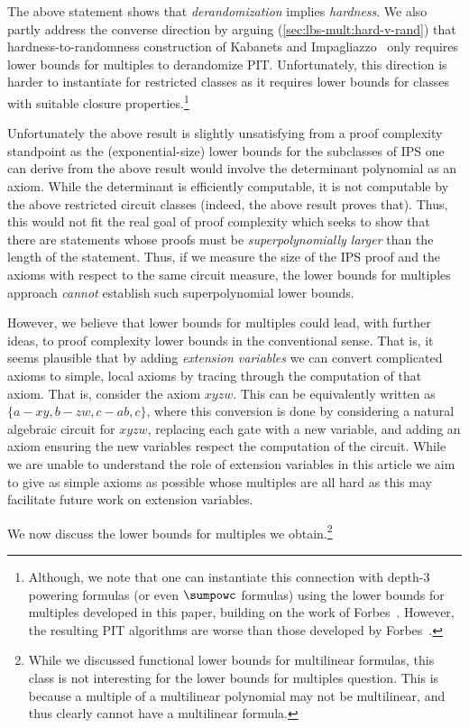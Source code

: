 \documentclass[11pt]{article}
\numberwithin{equation}{section}
\theoremstyle{definition}
\theoremstyle{plain}
\begin{document}
The above statement shows that \emph{derandomization} implies \emph{hardness}.  We also partly address the converse direction by arguing (\autoref{sec:lbs-mult:hard-v-rand}) that hardness-to-randomness construction of Kabanets and Impagliazzo~\cite{KabanetsImpagliazzo04} only requires lower bounds for multiples to derandomize PIT\@.  Unfortunately, this direction is harder to instantiate for restricted classes as it requires lower bounds for classes with suitable closure properties.\footnote{Although, we note that one can instantiate this connection with depth-3 powering formulas (or even $\sumpowc$ formulas) using the lower bounds for multiples developed in this paper, building on the work of Forbes~\cite{Forbes15}.  However, the resulting PIT algorithms are worse than those developed by Forbes~\cite{Forbes15}.}

Unfortunately the above result is slightly unsatisfying from a proof complexity standpoint as the (exponential-size) lower bounds for the subclasses of IPS one can derive from the above result would involve the determinant polynomial as an axiom.  While the determinant is efficiently computable, it is not computable by the above restricted circuit classes (indeed, the above result proves that).
Thus, %
this would not fit the real goal of proof complexity which seeks to show that there are statements whose proofs must be
%
\emph{superpolynomially larger}  %
than the length of the statement.  Thus, if we measure the size of the IPS proof and the axioms with respect to the same circuit measure, the lower bounds for multiples approach \emph{cannot} establish such superpolynomial lower bounds. %

However, we believe that lower bounds for multiples could lead, with further ideas, to proof complexity lower bounds in the conventional sense.  That is, it seems plausible that by adding \emph{extension variables} we can convert complicated axioms to simple, local axioms by tracing through the computation of that axiom.  That is, consider the axiom $xyzw$.  This can be equivalently written as $\{a-xy,b-zw,c-ab,c\}$, where this conversion is done by considering a natural algebraic circuit for $xyzw$, replacing each gate with a new variable, and adding an axiom ensuring the new variables respect the computation of the circuit.  While we are unable to understand the role of extension variables in this article
we aim to give as simple axioms as possible whose multiples
are all hard as this may facilitate future work on extension variables.

We now discuss the lower bounds for multiples we obtain.\footnote{While we discussed functional lower bounds for multilinear formulas, this class is not interesting for the lower bounds for multiples question.  This is because a multiple of a multilinear polynomial may not be multilinear, and thus clearly cannot have a multilinear formula.}
\end{document}
